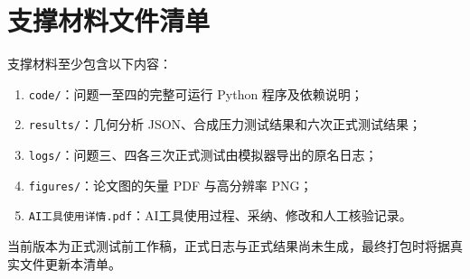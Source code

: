 \section{支撑材料文件清单}

支撑材料至少包含以下内容：
\begin{enumerate}
  \item \texttt{code/}：问题一至四的完整可运行 Python 程序及依赖说明；
  \item \texttt{results/}：几何分析 JSON、合成压力测试结果和六次正式测试结果；
  \item \texttt{logs/}：问题三、四各三次正式测试由模拟器导出的原名日志；
  \item \texttt{figures/}：论文图的矢量 PDF 与高分辨率 PNG；
  \item \texttt{AI工具使用详情.pdf}：AI工具使用过程、采纳、修改和人工核验记录。
\end{enumerate}

当前版本为正式测试前工作稿，正式日志与正式结果尚未生成，最终打包时将据真实文件更新本清单。

